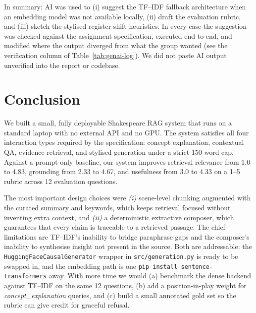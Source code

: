 \documentclass[10pt,twocolumn,a4paper]{article}
\begin{document}
In summary: AI was used to (i) suggest the TF--IDF fallback
architecture when an embedding model was not available locally,
(ii) draft the evaluation rubric, and (iii) sketch the stylised
register-shift heuristics. In every case the suggestion was checked
against the assignment specification, executed end-to-end, and
modified where the output diverged from what the group wanted
(see the verification column of Table~\ref{tab:genai-log}).
We did not paste AI output unverified into the report or codebase.

\section{Conclusion}
\label{sec:conclusion}

We built a small, fully deployable Shakespeare RAG system that runs
on a standard laptop with no external API and no GPU. The system
satisfies all four interaction types required by the specification:
concept explanation, contextual QA, evidence retrieval, and stylised
generation under a strict 150-word cap. Against a prompt-only
baseline, our system improves retrieval relevance from 1.0 to 4.83,
grounding from 2.33 to 4.67, and usefulness from 3.0 to 4.33 on a
1--5 rubric across 12 evaluation questions.

The most important design choices were
\textit{(i)} scene-level chunking augmented with the curated summary
and keywords, which keeps retrieval focused without inventing extra
context, and
\textit{(ii)} a deterministic extractive composer, which guarantees
that every claim is traceable to a retrieved passage.
The chief limitations are TF--IDF's inability to bridge paraphrase
gaps and the composer's inability to synthesise insight not present in
the source. Both are addressable: the
\verb|HuggingFaceCausalGenerator| wrapper in
\verb|src/generation.py| is ready to be swapped in, and the embedding
path is one \verb|pip install sentence-transformers| away. With more
time we would (a) benchmark the dense backend against TF--IDF on the
same 12 questions, (b) add a position-in-play weight for
\emph{concept\_explanation} queries, and (c) build a small annotated
gold set so the rubric can give credit for graceful refusal.
\end{document}
